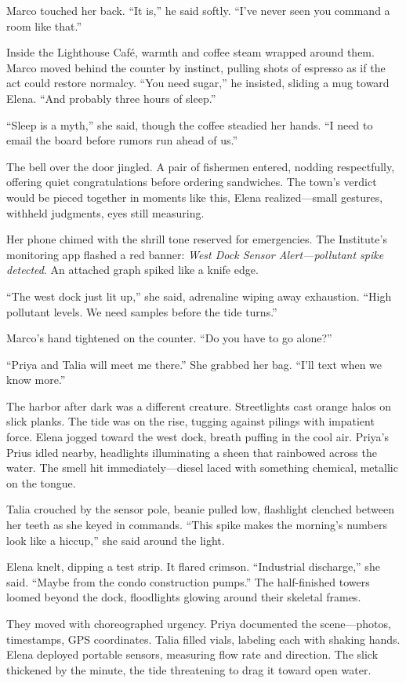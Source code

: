Marco touched her back. “It is,” he said softly. “I’ve never seen you command a room like that.”

Inside the Lighthouse Café, warmth and coffee steam wrapped around them. Marco moved behind the counter by instinct, pulling shots of espresso as if the act could restore normalcy. “You need sugar,” he insisted, sliding a mug toward Elena. “And probably three hours of sleep.”

“Sleep is a myth,” she said, though the coffee steadied her hands. “I need to email the board before rumors run ahead of us.”

The bell over the door jingled. A pair of fishermen entered, nodding respectfully, offering quiet congratulations before ordering sandwiches. The town’s verdict would be pieced together in moments like this, Elena realized—small gestures, withheld judgments, eyes still measuring.

Her phone chimed with the shrill tone reserved for emergencies. The Institute’s monitoring app flashed a red banner: \textit{West Dock Sensor Alert—pollutant spike detected}. An attached graph spiked like a knife edge.

“The west dock just lit up,” she said, adrenaline wiping away exhaustion. “High pollutant levels. We need samples before the tide turns.”

Marco’s hand tightened on the counter. “Do you have to go alone?”

“Priya and Talia will meet me there.” She grabbed her bag. “I’ll text when we know more.”

The harbor after dark was a different creature. Streetlights cast orange halos on slick planks. The tide was on the rise, tugging against pilings with impatient force. Elena jogged toward the west dock, breath puffing in the cool air. Priya’s Prius idled nearby, headlights illuminating a sheen that rainbowed across the water. The smell hit immediately—diesel laced with something chemical, metallic on the tongue.

Talia crouched by the sensor pole, beanie pulled low, flashlight clenched between her teeth as she keyed in commands. “This spike makes the morning’s numbers look like a hiccup,” she said around the light.

Elena knelt, dipping a test strip. It flared crimson. “Industrial discharge,” she said. “Maybe from the condo construction pumps.” The half-finished towers loomed beyond the dock, floodlights glowing around their skeletal frames.

They moved with choreographed urgency. Priya documented the scene—photos, timestamps, GPS coordinates. Talia filled vials, labeling each with shaking hands. Elena deployed portable sensors, measuring flow rate and direction. The slick thickened by the minute, the tide threatening to drag it toward open water.

